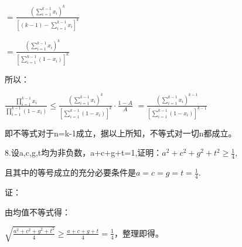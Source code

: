 \documentclass[12pt]{ctexart}
\begin{document}
$=\frac{(\sum\limits_{i=1}^{k-1}x_i)^k}{[{(k-1)}-\sum\limits_{i=1}^{k-1}{x_i}]^k}$

$=\frac{(\sum\limits_{i=1}^{k-1}x_i)^k}{[\sum\limits_{i=1}^{k-1}{(1-x_i)}]^k}$

所以：

$\frac{\prod\limits_{i=1}^{k-1}{x_i}}{\prod\limits_{i=1}^{k-1}(1-x_i)}\le\frac{(\sum\limits_{i=1}^{k-1}x_i)^k}{[\sum\limits_{i=1}^{k-1}{(1-x_i)}]^k}\cdot\frac{1-A}{A}$
$=\frac{(\sum\limits_{i=1}^{k-1}x_i)^{k-1}}{[\sum\limits_{i=1}^{k-1}{(1-x_i)}]^{k-1}}$

即不等式对于n=k-1成立，据以上所知，不等式对一切n都成立。

8.设a,c,g,t均为非负数，a+c+g+t=1,证明：$a^2+c^2+g^2+t^2\ge\frac{1}{4}$,

且其中的等号成立的充分必要条件是$a=c=g=t=\frac{1}{4}$.

证：

由均值不等式得：

$\sqrt{\frac{a^2+c^2+g^2+t^2}{4}}\ge\frac{a+c+g+t}{4}=\frac{1}{4}$，整理即得。
\end{document}
